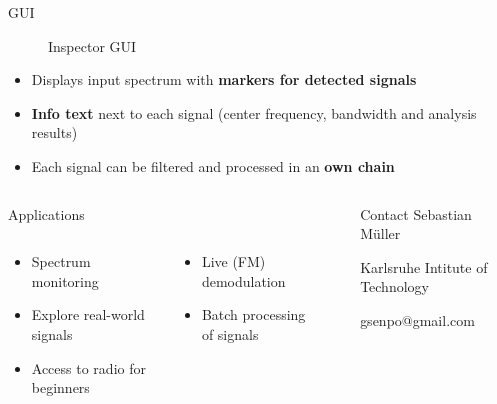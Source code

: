 \documentclass{beamer}
\begin{document}
\begin{frame}
\begin{columns}[t]
\begin{column}{0.66\textwidth}
\begin{block}{GUI}
\begin{figure}
      	\caption{Inspector GUI}
      \end{figure}
      \begin{itemize}
        \item Displays input spectrum with \textbf{markers for detected signals}
        \item \textbf{Info text} next to each signal (center frequency, bandwidth and analysis results)
        \item Each signal can be filtered and processed in an \textbf{own chain}
      \end{itemize}
      \end{block}
    \end{column}
  \end{columns}
  \begin{columns}[t]
  	\begin{column}{0.66\textwidth}
  		\begin{block}{Applications}
  			\begin{columns}
        \begin{column}{0.45\textwidth}
        \begin{itemize}
          \item Spectrum monitoring
          \item Explore real-world signals
          \item Access to radio for beginners
        \end{itemize}
        \end{column}
        \begin{column}{0.45\textwidth}
         \begin{itemize}
          \item Live (FM) demodulation
          \item Batch processing of signals
        \end{itemize}
        \end{column}
        \end{columns}
  		\end{block}
  	\end{column}
  	\begin{column}{0.01\textwidth}
  	\end{column}
  	\begin{column}{0.33\textwidth}
  		\begin{block}{Contact}
  			Sebastian Müller

  			Karlsruhe Intitute of Technology

  			gsenpo@gmail.com
  			\vspace{0.3em}
  		\end{block}
  	\end{column}
  \end{columns}
\end{frame}
\end{document}
